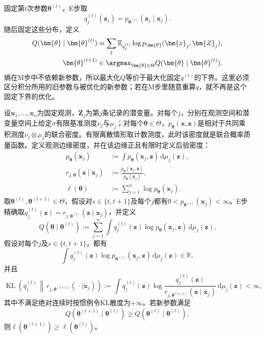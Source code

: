 固定第$t$次参数$\bm{\theta}^{(t)}$，E步取
\[
  q_j^{(t)}(\bm{z}_j)
    =p_{\bm{\theta}^{(t)}}(\bm{z}_j\mid\bm{x}_j).
\]
随后固定这些分布，定义
\begin{equation}
  \begin{aligned}
    Q(\bm{\theta}\mid\bm{\theta}^{(t)})
      &=\sum_j\mathbb{E}_{q_j^{(t)}}
          \log p_{\bm{\theta}}(\bm{x}_j,\bm{Z}_j),\\
    \bm{\theta}^{(t+1)}
      &\in\argmax_{\bm{\theta}\in\Theta}
         Q(\bm{\theta}\mid\bm{\theta}^{(t)}).
  \end{aligned}
  \label{eq:pgm-parameter-learning-em-update}
\end{equation}
熵在M步中不依赖新参数，所以最大化$Q$等价于最大化固定$q^{(t)}$的下界。这里必须区分积分所用的旧参数与被优化的新参数；若在M步里随意重算$q$，就不再是这个固定下界的优化。

\begin{theorem}[EM的观测似然单调性]
  \label{thm:pgm-parameter-learning-em-monotonicity}
  设$\bm{x}_1,\ldots,\bm{x}_n$为固定观测，$\bm{Z}_j$为第$j$条记录的潜变量。对每个$j$，分别在观测空间和潜变量空间上给定$\sigma$有限基准测度$\nu_j$与$\mu_j$；对每个$\bm{\theta}\in\Theta$，$p_{\bm{\theta}}(\bm{x},\bm{z})$是相对于共同乘积测度$\nu_j\otimes\mu_j$的联合密度。有限离散情形取计数测度，此时该密度就是联合概率质量函数。定义观测边缘密度，并在该边缘正且有限时定义后验密度：
  \[
    \begin{aligned}
      p_{\bm{\theta}}(\bm{x}_j)
        &\mathrel{:=}\int
          p_{\bm{\theta}}(\bm{x}_j,\bm{z})\,
          \mathrm{d}\mu_j(\bm{z}),\\
      r_{j,\bm{\theta}}(\bm{z}\mid\bm{x}_j)
        &\mathrel{:=}
          \frac{p_{\bm{\theta}}(\bm{x}_j,\bm{z})}
               {p_{\bm{\theta}}(\bm{x}_j)},\\
      \ell(\bm{\theta})
        &\mathrel{:=}\sum_{j=1}^n
          \log p_{\bm{\theta}}(\bm{x}_j).
    \end{aligned}
  \]
  取$\bm{\theta}^{(t)},\bm{\theta}^{(t+1)}\in\Theta$，假设对$s\in\{t,t+1\}$及每个$j$都有$0<p_{\bm{\theta}^{(s)}}(\bm{x}_j)<\infty$。E步精确取$q_j^{(t)}(\bm{z})=r_{j,\bm{\theta}^{(t)}}(\bm{z}\mid\bm{x}_j)$，并定义
  \[
    Q(\bm{\theta}\mid\bm{\theta}^{(t)})
      \mathrel{:=}\sum_{j=1}^n\int
        q_j^{(t)}(\bm{z})
        \log p_{\bm{\theta}}(\bm{x}_j,\bm{z})\,
        \mathrm{d}\mu_j(\bm{z}).
  \]
  假设对每个$j$及$s\in\{t,t+1\}$，都有
  \[
    \int q_j^{(t)}(\bm{z})
      \log p_{\bm{\theta}^{(s)}}(\bm{x}_j,\bm{z})\,
      \mathrm{d}\mu_j(\bm{z})\in\mathbb{R},
  \]
  并且
  \[
    \operatorname{KL}\!\left(
      q_j^{(t)}\,\middle\|\,
      r_{j,\bm{\theta}^{(t+1)}}(\,\cdot\mid\bm{x}_j)
    \right)
    \mathrel{:=}\int q_j^{(t)}(\bm{z})
      \log\frac{q_j^{(t)}(\bm{z})}
                    {r_{j,\bm{\theta}^{(t+1)}}(\bm{z}\mid\bm{x}_j)}
      \,\mathrm{d}\mu_j(\bm{z})
    <\infty,
  \]
  其中不满足绝对连续时按惯例令KL散度为$+\infty$。若新参数满足
  \[
    Q(\bm{\theta}^{(t+1)}\mid\bm{\theta}^{(t)})
    \geq Q(\bm{\theta}^{(t)}\mid\bm{\theta}^{(t)}),
  \]
  则$\ell(\bm{\theta}^{(t+1)})\geq\ell(\bm{\theta}^{(t)})$。
\end{theorem}

